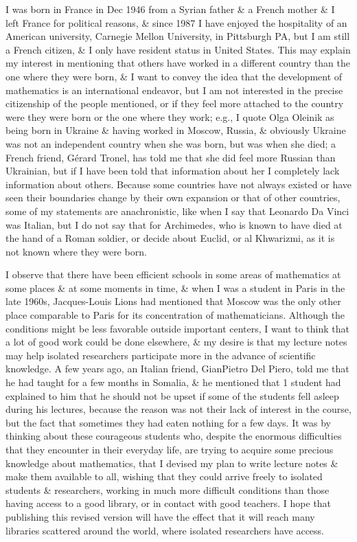 \documentclass{article}
\begin{document}
\begin{enumerate}
	I was born in France in Dec 1946 from a Syrian father \& a French mother \& I left France for political reasons, \& since 1987 I have enjoyed the hospitality of an American university, {\sc Carnegie Mellon} University, in Pittsburgh PA, but I am still a French citizen, \& I only have resident status in United States. This may explain my interest in mentioning that others have worked in a different country than the one where they were born, \& I want to convey the idea that the development of mathematics is an international endeavor, but I am not interested in the precise citizenship of the people mentioned, or if they feel more attached to the country were they were born or the one where they work; e.g., I quote {\sc Olga Oleinik} as being born in Ukraine \& having worked in Moscow, Russia, \& obviously Ukraine was not an independent country when she was born, but was when she died; a French friend, {\sc G\'erard Tronel}, has told me that she did feel more Russian than Ukrainian, but if I have been told that information about her I completely lack information about others. Because some countries have not always existed or have seen their boundaries change by their own expansion or that of other countries, some of my statements are anachronistic, like when I say that {\sc Leonardo Da Vinci} was Italian, but I do not say that for {\sc Archimedes}, who is known to have died at the hand of a Roman soldier, or decide about {\sc Euclid}, or {\sc al Khwarizmi}, as it is not known where they were born.
	
	I observe that there have been efficient schools in some areas of mathematics at some places \& at some moments in time, \& when I was a student in Paris in the late 1960s, {\sc Jacques-Louis Lions} had mentioned that Moscow was the only other place comparable to Paris for its concentration of mathematicians. Although the conditions might be less favorable outside important centers, I want to think that a lot of good work could be done elsewhere, \& my desire is that my lecture notes may help isolated researchers participate more in the advance of scientific knowledge. A few years ago, an Italian friend, {\sc GianPietro Del Piero}, told me that he had taught for a few months in Somalia, \& he mentioned that 1 student had explained to him that he should not be upset if some of the students fell asleep during his lectures, because the reason was not their lack of interest in the course, but the fact that sometimes they had eaten nothing for a few days. It was by thinking about these courageous students who, despite the enormous difficulties that they encounter in their everyday life, are trying to acquire some precious knowledge about mathematics, that I devised my plan to write lecture notes \& make them available to all, wishing that they could arrive freely to isolated students \& researchers, working in much more difficult conditions than those having access to a good library, or in contact with good teachers. I hope that publishing this revised version will have the effect that it will reach many libraries scattered around the world, where isolated researchers have access.
	

\end{enumerate}
\end{document}
